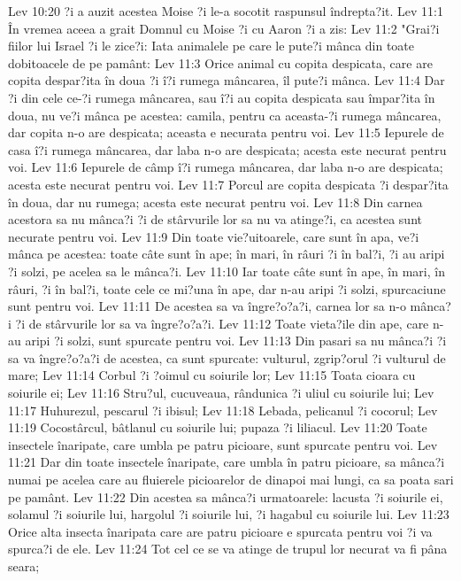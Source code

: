 Lev 10:20  ?i a auzit acestea Moise ?i le-a socotit raspunsul îndrepta?it.
Lev 11:1  În vremea aceea a grait Domnul cu Moise ?i cu Aaron ?i a zis:
Lev 11:2  "Grai?i fiilor lui Israel ?i le zice?i: Iata animalele pe care le pute?i mânca din toate dobitoacele de pe pamânt:
Lev 11:3  Orice animal cu copita despicata, care are copita despar?ita în doua ?i î?i rumega mâncarea, îl pute?i mânca.
Lev 11:4  Dar ?i din cele ce-?i rumega mâncarea, sau î?i au copita despicata sau împar?ita în doua, nu ve?i mânca pe acestea: camila, pentru ca aceasta-?i rumega mâncarea, dar copita n-o are despicata; aceasta e necurata pentru voi.
Lev 11:5  Iepurele de casa î?i rumega mâncarea, dar laba n-o are despicata; acesta este necurat pentru voi.
Lev 11:6  Iepurele de câmp î?i rumega mâncarea, dar laba n-o are despicata; acesta este necurat pentru voi.
Lev 11:7  Porcul are copita despicata ?i despar?ita în doua, dar nu rumega; acesta este necurat pentru voi.
Lev 11:8  Din carnea acestora sa nu mânca?i ?i de stârvurile lor sa nu va atinge?i, ca acestea sunt necurate pentru voi.
Lev 11:9  Din toate vie?uitoarele, care sunt în apa, ve?i mânca pe acestea: toate câte sunt în ape; în mari, în râuri ?i în bal?i, ?i au aripi ?i solzi, pe acelea sa le mânca?i.
Lev 11:10  Iar toate câte sunt în ape, în mari, în râuri, ?i în bal?i, toate cele ce mi?una în ape, dar n-au aripi ?i solzi, spurcaciune sunt pentru voi.
Lev 11:11  De acestea sa va îngre?o?a?i, carnea lor sa n-o mânca?i ?i de stârvurile lor sa va îngre?o?a?i.
Lev 11:12  Toate vieta?ile din ape, care n-au aripi ?i solzi, sunt spurcate pentru voi.
Lev 11:13  Din pasari sa nu mânca?i ?i sa va îngre?o?a?i de acestea, ca sunt spurcate: vulturul, zgrip?orul ?i vulturul de mare;
Lev 11:14  Corbul ?i ?oimul cu soiurile lor;
Lev 11:15  Toata cioara cu soiurile ei;
Lev 11:16  Stru?ul, cucuveaua, rândunica ?i uliul cu soiurile lui;
Lev 11:17  Huhurezul, pescarul ?i ibisul;
Lev 11:18  Lebada, pelicanul ?i cocorul;
Lev 11:19  Cocostârcul, bâtlanul cu soiurile lui; pupaza ?i liliacul.
Lev 11:20  Toate insectele înaripate, care umbla pe patru picioare, sunt spurcate pentru voi.
Lev 11:21  Dar din toate insectele înaripate, care umbla în patru picioare, sa mânca?i numai pe acelea care au fluierele picioarelor de dinapoi mai lungi, ca sa poata sari pe pamânt.
Lev 11:22  Din acestea sa mânca?i urmatoarele: lacusta ?i soiurile ei, solamul ?i soiurile lui, hargolul ?i soiurile lui, ?i hagabul cu soiurile lui.
Lev 11:23  Orice alta insecta înaripata care are patru picioare e spurcata pentru voi ?i va spurca?i de ele.
Lev 11:24  Tot cel ce se va atinge de trupul lor necurat va fi pâna seara;
